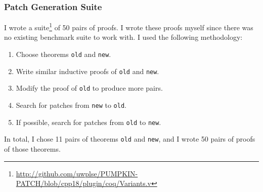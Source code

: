 \subsubsection{Patch Generation Suite}
\label{sec:suite}

I wrote a suite\footnote{\url{http://github.com/uwplse/PUMPKIN-PATCH/blob/cpp18/plugin/coq/Variants.v}} of 50 pairs of proofs. %
I wrote these proofs myself since there was no existing benchmark suite to work with.
I used the following methodology:

\begin{enumerate}
\item Choose theorems \lstinline{old} and \lstinline{new}.
\item Write similar inductive proofs of \lstinline{old} and \lstinline{new}.
\item Modify the proof of \lstinline{old} to produce more pairs.
\item Search for patches from \lstinline{new} to \lstinline{old}.
\item If possible, search for patches from \lstinline{old} to \lstinline{new}.
\end{enumerate}
In total, I chose 11 pairs of theorems \lstinline{old} and \lstinline{new}, and I wrote
50 pairs of proofs of those theorems.

\iffalse
For example, one pair of theorems \lstinline{old} and \lstinline{new} was a 
simplification of the auxiliary lemmas
that we encountered in the case study in Section~\ref{sec:foundations}.
For the first proof of \lstinline{old}, we added a rewrite, like in the case study:

\begin{lstlisting}[language=coq]
    (@\diff{rewrite <- plus\_n\_O.}@) rewrite -> plus_comm.
\end{lstlisting}

For the second proof of \lstinline{old}, we commuted the rewrites:

\begin{lstlisting}[language=coq]
    rewrite -> plus_comm. (@\diff{rewrite <- plus\_n\_O.}@)
\end{lstlisting} 

We then searched for patches in both directions,
since the conclusions of \lstinline{old}
and \lstinline{new} were propositionally equal.
\fi

